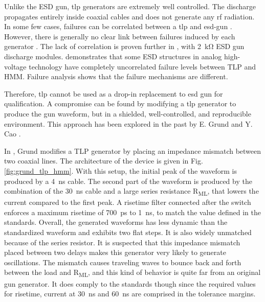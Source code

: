 Unlike the ESD gun, \gls{tlp} generators are extremely well controlled.
The discharge propagates entirely inside coaxial cables and does not generate any \gls{rf} radiation.
In some few cases, failures can be correlated between a \gls{tlp} and \gls{esd-gun} \cite{correlation-system-level-esd-tlp}.
However, there is generally no clear link between failures induced by each generator \cite{miscorrelation-esd-hmm}.
The lack of correlation is proven further in \cite{correlation-system-level-esd-tlp}, with \SI{2}{\kilo\ohm} ESD gun discharge modules.
\cite{correlation-system-level-esd-tlp} demonstrates that some ESD structures in analog high-voltage technology have completely uncorrelated failure levels between TLP and HMM. Failure analysis shows that the failure mechanisms are different.

Therefore, \gls{tlp} cannot be used as a drop-in replacement to \gls{esd} gun for qualification.
A compromise can be found by modifying a \gls{tlp} generator to produce the gun waveform, but in a shielded, well-controlled, and reproducible environment.
This approach has been explored in the past by E. Grund \cite{iec61000-tlp} and Y. Cao \cite{tlp-based-hmm}.

In \cite{iec61000-tlp}, Grund modifies a TLP generator by placing an impedance mismatch between two coaxial lines.
The architecture of the device is given in Fig. \ref{fig:grund_tlp_hmm}.
With this setup, the initial peak of the waveform is produced by a \SI{4}{\nano\second} cable.
The second part of the waveform is produced by the combination of the \SI{30}{\nano\second} cable and a large series resistance R\textsubscript{ML}, that lowers the current compared to the first peak.
A risetime filter connected after the switch enforces a maximum risetime of \SI{700}{\pico\second} to \SI{1}{\nano\second}, to match the value defined in the standards.
Overall, the generated waveforms has less dynamic than the standardized waveform and exhibits two flat steps.
It is also widely unmatched because of the series resistor.
It is suspected that this impedance mismatch placed between two delays makes this generator very likely to generate oscillations.
The mismatch causes traveling waves to bounce back and forth between the load and R\textsubscript{ML}, and this kind of behavior is quite far from an original gun generator.
It does comply to the standards though since the required values for risetime, current at \SI{30}{\nano\second} and \SI{60}{\nano\second} are comprised in the tolerance margins.

